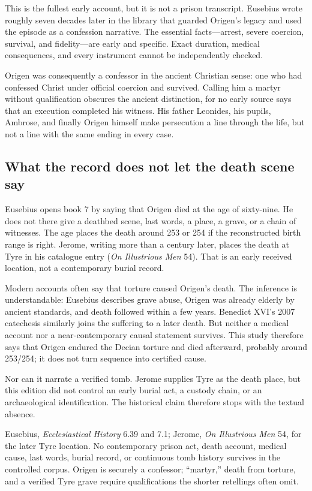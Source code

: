 This is the fullest early account, but it is not a prison transcript. Eusebius
wrote roughly seven decades later in the library that guarded Origen's legacy and
used the episode as a confession narrative. The essential facts---arrest,
severe coercion, survival, and fidelity---are early and specific. Exact
duration, medical consequences, and every instrument cannot be independently
checked.

Origen was consequently a confessor in the ancient Christian sense: one who
had confessed Christ under official coercion and survived. Calling him a
martyr without qualification obscures the ancient distinction, for no early
source says that an execution completed his witness. His father Leonides, his
pupils, Ambrose, and finally Origen himself make persecution a line through the
life, but not a line with the same ending in every case.

\subsection{What the record does not let the death scene say}

Eusebius opens book 7 by saying that Origen died at the age of sixty-nine. He
does not there give a deathbed scene, last words, a place, a grave, or a chain
of witnesses. The age places the death around 253 or 254 if the reconstructed
birth range is right. Jerome, writing more than a century later, places the
death at Tyre in his catalogue entry (\emph{On Illustrious Men} 54). That is an
early received location, not a contemporary burial record.

Modern accounts often say that torture caused Origen's death. The inference is
understandable: Eusebius describes grave abuse, Origen was already elderly by
ancient standards, and death followed within a few years. Benedict XVI's 2007
catechesis similarly joins the suffering to a later death. But neither a
medical account nor a near-contemporary causal statement survives. This study
therefore says that Origen endured the Decian torture and died afterward,
probably around 253/254; it does not turn sequence into certified cause.

Nor can it narrate a verified tomb. Jerome supplies Tyre as the death place,
but this edition did not control an early burial act, a custody chain, or an
archaeological identification. The historical claim therefore stops with the
textual absence.

{Eusebius, \emph{Ecclesiastical History} 6.39 and 7.1; Jerome, \emph{On
Illustrious Men} 54, for the later Tyre location.}
{No contemporary prison act, death account, medical cause, last words, burial
record, or continuous tomb history survives in the controlled corpus. Origen
is securely a confessor; ``martyr,'' death from torture, and a verified Tyre
grave require qualifications the shorter retellings often omit.}
